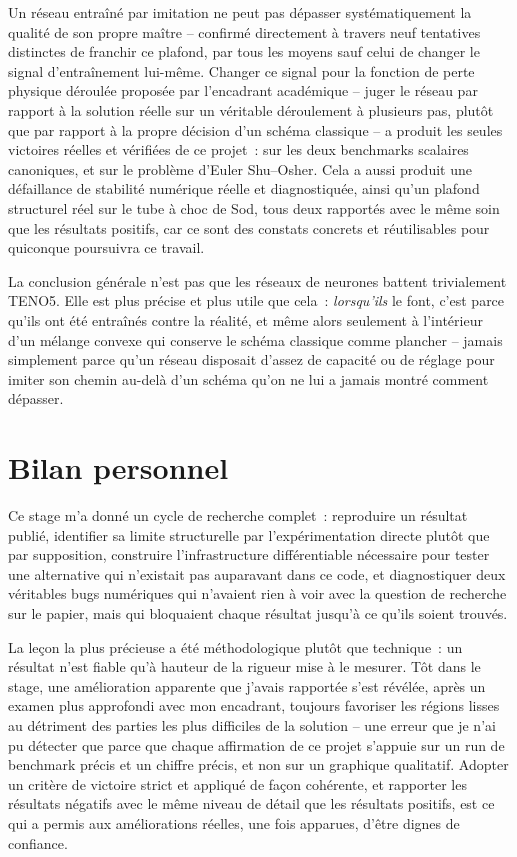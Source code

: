 \documentclass[11pt]{article}
\begin{document}
Un réseau entraîné par imitation ne peut pas dépasser systématiquement la
qualité de son propre maître -- confirmé directement à travers neuf
tentatives distinctes de franchir ce plafond, par tous les moyens sauf
celui de changer le signal d'entraînement lui-même. Changer ce signal
pour la fonction de perte physique déroulée proposée par l'encadrant
académique -- juger le réseau par rapport à la solution réelle sur un
véritable déroulement à plusieurs pas, plutôt que par rapport à la propre
décision d'un schéma classique -- a produit les seules victoires réelles
et vérifiées de ce projet~: sur les deux benchmarks scalaires canoniques,
et sur le problème d'Euler Shu--Osher. Cela a aussi produit une
défaillance de stabilité numérique réelle et diagnostiquée, ainsi qu'un
plafond structurel réel sur le tube à choc de Sod, tous deux rapportés
avec le même soin que les résultats positifs, car ce sont des constats
concrets et réutilisables pour quiconque poursuivra ce travail.

La conclusion générale n'est pas que les réseaux de neurones battent
trivialement TENO5. Elle est plus précise et plus utile que cela~:
\emph{lorsqu'ils} le font, c'est parce qu'ils ont été entraînés contre la
réalité, et même alors seulement à l'intérieur d'un mélange convexe qui
conserve le schéma classique comme plancher -- jamais simplement parce
qu'un réseau disposait d'assez de capacité ou de réglage pour imiter son
chemin au-delà d'un schéma qu'on ne lui a jamais montré comment dépasser.

\section{Bilan personnel}

Ce stage m'a donné un cycle de recherche complet~: reproduire un résultat
publié, identifier sa limite structurelle par l'expérimentation directe
plutôt que par supposition, construire l'infrastructure différentiable
nécessaire pour tester une alternative qui n'existait pas auparavant dans
ce code, et diagnostiquer deux véritables bugs numériques qui n'avaient
rien à voir avec la question de recherche sur le papier, mais qui
bloquaient chaque résultat jusqu'à ce qu'ils soient trouvés.

La leçon la plus précieuse a été méthodologique plutôt que technique~: un
résultat n'est fiable qu'à hauteur de la rigueur mise à le mesurer. Tôt
dans le stage, une amélioration apparente que j'avais rapportée s'est
révélée, après un examen plus approfondi avec mon encadrant, toujours
favoriser les régions lisses au détriment des parties les plus difficiles
de la solution -- une erreur que je n'ai pu détecter que parce que chaque
affirmation de ce projet s'appuie sur un run de benchmark précis et un
chiffre précis, et non sur un graphique qualitatif. Adopter un critère de
victoire strict et appliqué de façon cohérente, et rapporter les résultats
négatifs avec le même niveau de détail que les résultats positifs, est ce
qui a permis aux améliorations réelles, une fois apparues, d'être dignes
de confiance.
\end{document}
